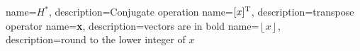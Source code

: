 {       name={$H^*$},
        description={Conjugate operation}
}
{       name={$[ x ]^{\rm T}$},
        description={transpose operator}
}
{       name={\textbf{x}},
        description={vectors are in bold}
}
{       name={$\left\lfloor x \right\rfloor$},
        description={round to the lower integer of $x$}
}
